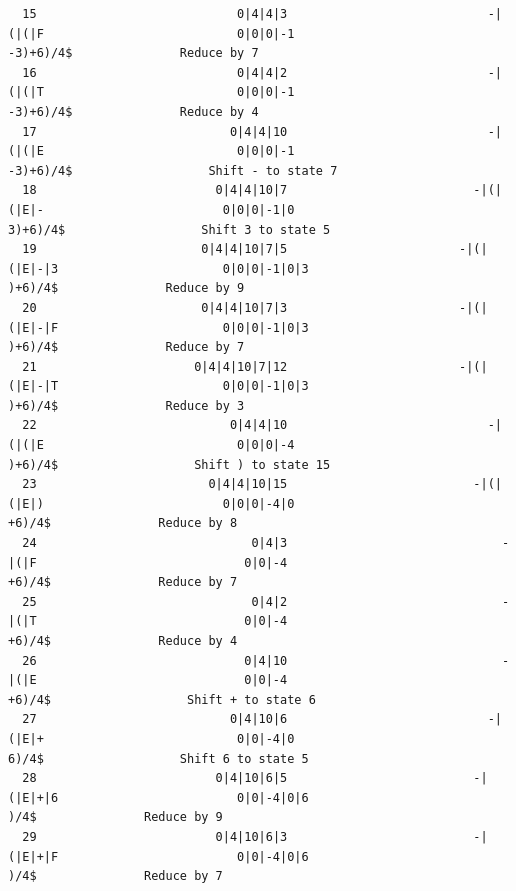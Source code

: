 \documentclass[UTF8]{ctexart}
\begin{document}
\begin{lstlisting}
  15                            0|4|4|3                            -|(|(|F                           0|0|0|-1                          -3)+6)/4$               Reduce by 7
  16                            0|4|4|2                            -|(|(|T                           0|0|0|-1                          -3)+6)/4$               Reduce by 4
  17                           0|4|4|10                            -|(|(|E                           0|0|0|-1                          -3)+6)/4$                   Shift - to state 7
  18                         0|4|4|10|7                          -|(|(|E|-                         0|0|0|-1|0                           3)+6)/4$                   Shift 3 to state 5
  19                       0|4|4|10|7|5                        -|(|(|E|-|3                       0|0|0|-1|0|3                            )+6)/4$               Reduce by 9
  20                       0|4|4|10|7|3                        -|(|(|E|-|F                       0|0|0|-1|0|3                            )+6)/4$               Reduce by 7
  21                      0|4|4|10|7|12                        -|(|(|E|-|T                       0|0|0|-1|0|3                            )+6)/4$               Reduce by 3
  22                           0|4|4|10                            -|(|(|E                           0|0|0|-4                            )+6)/4$                   Shift ) to state 15
  23                        0|4|4|10|15                          -|(|(|E|)                         0|0|0|-4|0                             +6)/4$               Reduce by 8
  24                              0|4|3                              -|(|F                             0|0|-4                             +6)/4$               Reduce by 7
  25                              0|4|2                              -|(|T                             0|0|-4                             +6)/4$               Reduce by 4
  26                             0|4|10                              -|(|E                             0|0|-4                             +6)/4$                   Shift + to state 6
  27                           0|4|10|6                            -|(|E|+                           0|0|-4|0                              6)/4$                   Shift 6 to state 5
  28                         0|4|10|6|5                          -|(|E|+|6                         0|0|-4|0|6                               )/4$               Reduce by 9
  29                         0|4|10|6|3                          -|(|E|+|F                         0|0|-4|0|6                               )/4$               Reduce by 7

\end{lstlisting}
\end{document}
